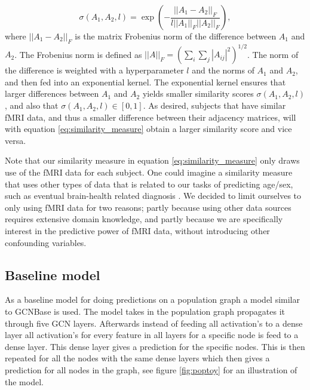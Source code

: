 \begin{equation}
    \sigma\left(A_1, A_2, l\right) = \exp{\left(- \frac{||A_1 - A_2||_F}{l ||A_1||_F ||A_2||_F} \right)},
    \label{eq:similarity_measure}
\end{equation}
where $||A_1 - A_2 ||_F$ is the matrix Frobenius norm of the difference between $A_1$ and $A_2$. The Frobenius norm is defined as $||A||_F = \left( \sum_i \sum_j |A_{ij}|^2 \right)^{1/2}$. The norm of the difference is weighted with a hyperparameter $l$ and the norms of $A_1$ and $A_2$, and then fed into an exponential kernel. The exponential kernel ensures that larger differences between $A_1$ and $A_2$ yields smaller similarity scores $\sigma\left(A_1, A_2, l\right)$, and also that  $\sigma\left(A_1, A_2, l\right) \in \left[0, 1\right]$. As desired, subjects that have similar fMRI data, and thus a smaller difference between their adjacency matrices, will with equation \eqref{eq:similarity_measure} obtain a larger similarity score and vice versa. 

Note that our similarity measure in equation \eqref{eq:similarity_measure} only draws use of the fMRI data for each subject. One could imagine a similarity measure that uses other types of data that is related to our tasks of predicting age/sex, such as eventual brain-health related diagnosis \cite{stankeviciute}. We decided to limit ourselves to only using fMRI data for two reasons; partly because using other data sources requires extensive domain knowledge, and partly because we are specifically interest in the predictive power of fMRI data, without introducing other confounding variables. 


\subsection{Baseline model}
As a baseline model for doing predictions on a population graph a model similar to GCNBase is used. The model takes in the population graph propagates it through five GCN layers. 
Afterwards instead of feeding all activation's to a dense layer all activation's for every feature in all layers for a specific node is feed to a dense layer. This dense layer gives a prediction for the specific nodes. This is then repeated for all the nodes with the same dense layers which then gives a prediction for all nodes in the graph, see figure \ref{fig:poptoy} for an illustration of the model. 

